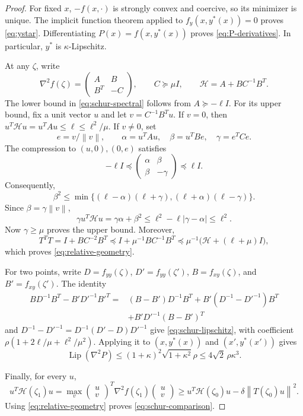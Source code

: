 \documentclass[11pt]{article}
\numberwithin{equation}{section}
\newcommand{\norm}[1]{\left\lVert#1\right\rVert}
\begin{document}
\begin{proof}
For fixed $x$, $-f(x,\cdot)$ is strongly convex and coercive, so its
minimizer is unique. The implicit function theorem applied to
$f_y(x,y^*(x))=0$ proves \eqref{eq:ystar}. Differentiating
$P(x)=f(x,y^*(x))$ proves \eqref{eq:P-derivatives}.
In particular, $y^*$ is $\kappa$-Lipschitz.

At any $\zeta$, write
\[
 \nabla^2f(\zeta)=
 \begin{pmatrix}A&B\\B^T&-C\end{pmatrix},
 \qquad C\succeq\mu I,
 \qquad \mathcal H=A+BC^{-1}B^T.
\]
The lower bound in \eqref{eq:schur-spectral} follows from
$A\succeq-\ell I$. For its upper bound, fix a unit vector $u$ and
let $v=C^{-1}B^Tu$. If $v=0$, then
$u^T\mathcal H u=u^TAu\le\ell\le\ell^2/\mu$.
If $v\ne0$, set
\[
 e=v/\norm v,\qquad
 \alpha=u^TAu,\quad \beta=u^TBe,\quad \gamma=e^TCe.
\]
The compression to $(u,0),(0,e)$ satisfies
\[
 -\ell I\preceq
 \begin{pmatrix}\alpha&\beta\\\beta&-\gamma\end{pmatrix}
 \preceq\ell I.
\]
Consequently,
\[
 \beta^2\le\min\{(\ell-\alpha)(\ell+\gamma),
                         (\ell+\alpha)(\ell-\gamma)\}.
\]
Since $\beta=\gamma\norm v$,
\[
 \gamma u^T\mathcal H u
 =\gamma\alpha+\beta^2
 \le\ell^2-\ell|\gamma-\alpha|\le\ell^2.
\]
Now $\gamma\ge\mu$ proves the upper bound. Moreover,
\[
 T^TT=I+BC^{-2}B^T
 \preceq I+\mu^{-1}BC^{-1}B^T
 \preceq\mu^{-1}\bigl(\mathcal H+(\ell+\mu)I\bigr),
\]
which proves \eqref{eq:relative-geometry}.

For two points, write $D=f_{yy}(\zeta)$, $D'=f_{yy}(\zeta')$,
$B=f_{xy}(\zeta)$, and $B'=f_{xy}(\zeta')$.
The identity
\[
\begin{split}
 BD^{-1}B^T-B'D'^{-1}B'^T
 ={}&(B-B')D^{-1}B^T
     +B'(D^{-1}-D'^{-1})B^T\\
    &+B'D'^{-1}(B-B')^T
\end{split}
\]
and $D^{-1}-D'^{-1}=D^{-1}(D'-D)D'^{-1}$ give
\eqref{eq:schur-lipschitz}, with coefficient
$\rho(1+2\ell/\mu+\ell^2/\mu^2)$.
Applying it to $(x,y^*(x))$ and $(x',y^*(x'))$ gives
\[
 \operatorname{Lip}(\nabla^2P)
 \le(1+\kappa)^2\sqrt{1+\kappa^2}\rho
 \le4\sqrt2\,\rho\kappa^3.
\]

Finally, for every $u$,
\[
 u^T\mathcal H(\zeta_1)u
 =\max_v\begin{pmatrix}u\\v\end{pmatrix}^{\!T}
              \nabla^2f(\zeta_1)
              \begin{pmatrix}u\\v\end{pmatrix}
 \ge u^T\mathcal H(\zeta_0)u-\delta\norm{T(\zeta_0)u}^2.
\]
Using \eqref{eq:relative-geometry} proves \eqref{eq:schur-comparison}.
\end{proof}
\end{document}
